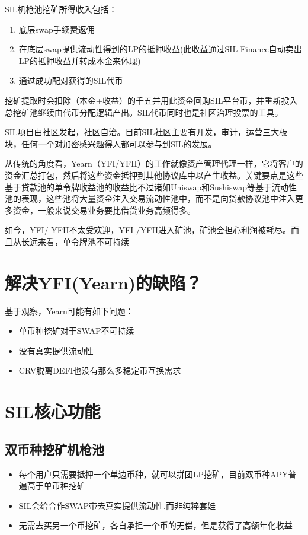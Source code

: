 \documentclass[11pt,letterpaper]{article}
\begin{document}
\begin{multicols}{2}
SIL机枪池挖矿所得收入包括：
\begin{enumerate}
    \item 底层swap手续费返佣
    \item 在底层swap提供流动性得到的LP的抵押收益(此收益通过SIL Finance自动卖出LP的抵押收益并转成本金来体现)
    \item 通过成功配对获得的SIL代币
\end{enumerate}
挖矿提取时会扣除（本金+收益）的千五并用此资金回购SIL平台币，并重新投入总挖矿池继续由代币分配逻辑产出。SIL代币同时也是社区治理投票的工具。

SIL项目由社区发起，社区自治。目前SIL社区主要有开发，审计，运营三大板块，任何一个对加密感兴趣得人都可以参与到SIL的发展。

从传统的角度看，Yearn（YFI/YFII）的工作就像资产管理代理一样，它将客户的资金汇总打包，然后将这些资金抵押到其他协议库中以产生收益。关键要点是这些基于贷款池的单令牌收益池的收益比不过诸如Uniswap和Sushiswap等基于流动性池的表现，这些池将大量资金注入交易流动性池中，而不是向贷款协议池中注入更多资金，一般来说交易业务要比借贷业务高频得多。

如今，YFI/ YFII不太受欢迎，YFI /YFII进入矿池，矿池会担心利润被耗尽。而且从长远来看，单令牌池不可持续

\section{解决YFI(Yearn)的缺陷？}
基于观察，Yearn可能有如下问题：
\begin{itemize}
  \item 单币种挖矿对于SWAP不可持续
  \item 没有真实提供流动性
  \item CRV脱离DEFI也没有那么多稳定币互换需求
\end{itemize}

\section{SIL核心功能}

\subsection{双币种挖矿机枪池}
\begin{itemize}
  \item 每个用户只需要抵押一个单边币种，就可以拼团LP挖矿，目前双币种APY普遍高于单币种挖矿
  \item SIL会给合作SWAP带去真实提供流动性.而非纯粹套娃
  \item 无需去买另一个币挖矿，各自承担一个币的无偿，但是获得了高额年化收益
\end{itemize}


\end{multicols}
\end{document}
